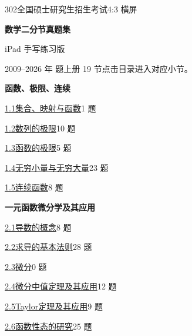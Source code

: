 \documentclass[UTF8,zihao=-4,fontset=fandol]{ctexart}
\begin{document}
\hypertarget{contents}{}
{\small\textcolor{accent}{302\quad 全国硕士研究生招生考试\hfill 4:3 横屏}}\par\bigskip
{\huge\bfseries 数学二分节真题集}\par\smallskip
{\large iPad 手写练习版}\par\smallskip
{\small 2009--2026 年 题\quad 上册 19 节\qquad 点击目录进入对应小节。}\par\bigskip

\begin{minipage}[t]{0.48\linewidth}
\medskip\textbf{函数、极限、连续}\par
{\small\hyperlink{sec-1.1}{1.1\quad 集合、映射与函数}\hfill 1 题}\par
{\small\hyperlink{sec-1.2}{1.2\quad 数列的极限}\hfill 10 题}\par
{\small\hyperlink{sec-1.3}{1.3\quad 函数的极限}\hfill 5 题}\par
{\small\hyperlink{sec-1.4}{1.4\quad 无穷小量与无穷大量}\hfill 23 题}\par
{\small\hyperlink{sec-1.5}{1.5\quad 连续函数}\hfill 8 题}\par
\medskip\textbf{一元函数微分学及其应用}\par
{\small\hyperlink{sec-2.1}{2.1\quad 导数的概念}\hfill 8 题}\par
{\small\hyperlink{sec-2.2}{2.2\quad 求导的基本法则}\hfill 28 题}\par
{\small\hyperlink{sec-2.3}{2.3\quad 微分}\hfill 0 题}\par
{\small\hyperlink{sec-2.4}{2.4\quad 微分中值定理及其应用}\hfill 12 题}\par
{\small\hyperlink{sec-2.5}{2.5\quad Taylor定理及其应用}\hfill 9 题}\par
{\small\hyperlink{sec-2.6}{2.6\quad 函数性态的研究}\hfill 25 题}\par
\end{minipage}%
\hfill
\end{document}

